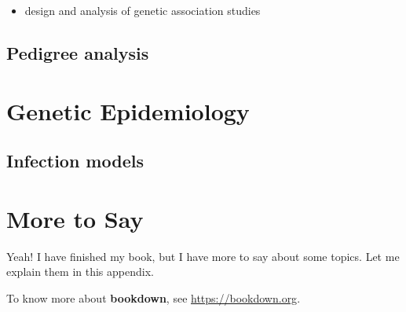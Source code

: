 \documentclass[12pt,]{krantz}
\providecommand{\tightlist}{%
  \setlength{\itemsep}{0pt}\setlength{\parskip}{0pt}}
\theoremstyle{definition}
\theoremstyle{definition}
\theoremstyle{definition}
\theoremstyle{remark}
\begin{document}
\begin{itemize}
\tightlist
\item
  design and analysis of genetic association studies
\end{itemize}

\section{Pedigree analysis}\label{pedigree-analysis}

\chapter{Genetic Epidemiology}\label{genetic-epidemiology}

\section{Infection models}\label{infection-models}

\cleardoublepage 

\appendix {}


\chapter{More to Say}\label{more-to-say}

Yeah! I have finished my book, but I have more to say about some topics.
Let me explain them in this appendix.

To know more about \textbf{bookdown}, see \url{https://bookdown.org}.



\printindex
\end{document}
